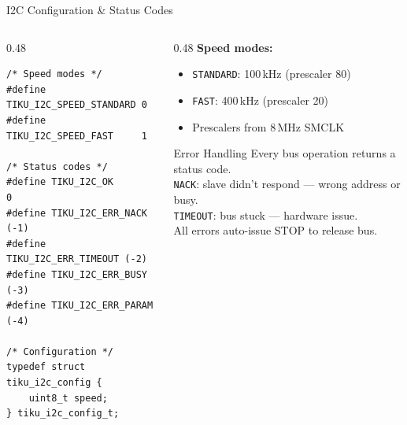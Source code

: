 \documentclass[aspectratio=169, 10pt]{beamer}
\begin{document}
\begin{frame}[fragile]{I2C Configuration \& Status Codes}
\begin{columns}[T]
\begin{column}{0.48\textwidth}
\begin{lstlisting}[style=cstyle,
  title={interfaces/bus/tiku\_i2c\_bus.h}]
/* Speed modes */
#define TIKU_I2C_SPEED_STANDARD 0
#define TIKU_I2C_SPEED_FAST     1

/* Status codes */
#define TIKU_I2C_OK           0
#define TIKU_I2C_ERR_NACK   (-1)
#define TIKU_I2C_ERR_TIMEOUT (-2)
#define TIKU_I2C_ERR_BUSY   (-3)
#define TIKU_I2C_ERR_PARAM  (-4)

/* Configuration */
typedef struct tiku_i2c_config {
    uint8_t speed;
} tiku_i2c_config_t;
\end{lstlisting}
\end{column}

\begin{column}{0.48\textwidth}
\textbf{Speed modes:}
\begin{itemize}
  \item \texttt{STANDARD}: 100\,kHz (prescaler 80)
  \item \texttt{FAST}: 400\,kHz (prescaler 20)
  \item Prescalers from 8\,MHz SMCLK
\end{itemize}

\vspace{0.5em}
\begin{block}{Error Handling}
Every bus operation returns a status code.\\
\texttt{NACK}: slave didn't respond --- wrong address or busy.\\
\texttt{TIMEOUT}: bus stuck --- hardware issue.\\
All errors auto-issue STOP to release bus.
\end{block}
\end{column}
\end{columns}
\end{frame}
\end{document}
